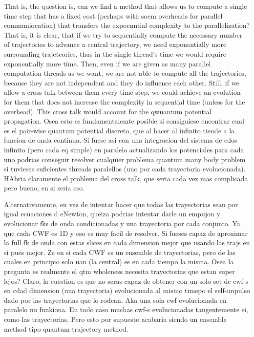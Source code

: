 \documentclass[11pt, a4paper]{article} %
\begin{document}
That is, the question is, can we find a method that allows us to compute a single time step that has a fixed cost (perhaps with soem overheads for parallel communiocation) that transfers the expoenntial complexity to the parallelization? That is, it is clear, that if we try to sequentially compute the necessary number of trajectories to advance a central trajectory, we need exponentially more surrounding trajetcories, thus in the single thread's time we would require exponentially more time. Then, even if we are given as many parallel computation threads as we want, we are not able to compute all the trajectories, because they are not independent and they do influence each other. Still, if we allow a cross talk between them every time step, we could achieve an evolution for them that does not increase the complexity in sequential time (unless for the overhead). This cross talk would account for the qwuantum potential propagation. Osea esto es fundamentalemte posible si consiguiese encontrar cual es el pair-wise quantum potential discreto, que al hacer al infinito tiende a la funcion de onda continua. Si fuese asi con una integracion del sistema de edos infinito (pero cada eq simple) en paralelo actualizando los potenciales para cada uno podrias conseguir resolver cualquier problema quantum many body problem si tuvieses suficientes threads paralellos (uno por cada trayectoria evolucionada). HAbria claramente el problema del cross talk, que seria cada vez mas complicada pero bueno, en si seria eso.

Alternativamente, en vez de intentar hacer que todas las trayectorias sean por igual ecuaciones d eNewton, queiza podrias intentar darle un empujon y evolucionar fks de onda condicionadas y una trayectoria por cada conjunto. Ya que cada CWF es 1D y eso es muy facil de resolver. Si fueses capaz de aproximar la full fk de onda con estas slices en cada dimension mejor que usando las trajs en si pues mejor. Ze en si cada CWF es un ensemble de trayectorias, pero de las cuales en principio solo uan (la central) es en cada tiempo la misma. Osea la pregunta es realmente el qtm wholeness necesita trayectorias que estan super lejos? Claro, la cuestion es que no seras capaz de obtener con un solo set de cwf-s en cdad dimension (una trayectoria) evolucionada al mismo timepo el self-impulso dado por las trayectorias que lo rodean. Aka una sola cwf evolucionada en paralelo no funkiona. En todo caso muchas cwf-s evolucionadas tangentemente si, como las trayectorias. Pero esto por supuesto acabaria siendo un ensemble method tipo quantum trajectory method. 
\end{document}
